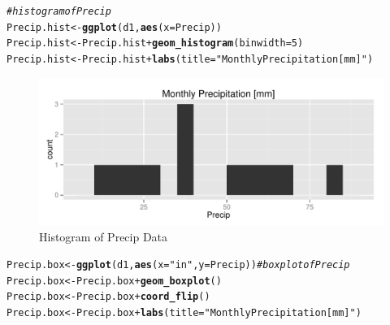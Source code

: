 \documentclass{article}\usepackage[]{graphicx}\usepackage[]{color}
\makeatletter
\def\maxwidth{ %
  \ifdim\Gin@nat@width>\linewidth
    \linewidth
  \else
    \Gin@nat@width
  \fi
}
\newcommand{\hlnum}[1]{\textcolor[rgb]{0.686,0.059,0.569}{#1}}%
\newcommand{\hlstr}[1]{\textcolor[rgb]{0.192,0.494,0.8}{#1}}%
\newcommand{\hlcom}[1]{\textcolor[rgb]{0.678,0.584,0.686}{\textit{#1}}}%
\newcommand{\hlopt}[1]{\textcolor[rgb]{0,0,0}{#1}}%
\newcommand{\hlstd}[1]{\textcolor[rgb]{0.345,0.345,0.345}{#1}}%
\newcommand{\hlkwb}[1]{\textcolor[rgb]{0.69,0.353,0.396}{#1}}%
\newcommand{\hlkwc}[1]{\textcolor[rgb]{0.333,0.667,0.333}{#1}}%
\newcommand{\hlkwd}[1]{\textcolor[rgb]{0.737,0.353,0.396}{\textbf{#1}}}%
\newenvironment{kframe}{%
 \def\at@end@of@kframe{}%
 \ifinner\ifhmode%
  \def\at@end@of@kframe{\end{minipage}}%
  \begin{minipage}{\columnwidth}%
 \fi\fi%
 \def\FrameCommand##1{\hskip\@totalleftmargin \hskip-\fboxsep
 \colorbox{shadecolor}{##1}\hskip-\fboxsep
     \hskip-\linewidth \hskip-\@totalleftmargin \hskip\columnwidth}%
 \MakeFramed {\advance\hsize-\width
   \@totalleftmargin\z@ \linewidth\hsize
   \@setminipage}}%
 {\par\unskip\endMakeFramed%
 \at@end@of@kframe}
\newenvironment{knitrout}{}{} %
\makeatother
\begin{document}
\begin{enumerate}
\begin{enumerate}
\begin{knitrout}
\color{fgcolor}\begin{kframe}
\begin{alltt}
\hlcom{# histogram of Precip}
\hlstd{Precip.hist} \hlkwb{<-} \hlkwd{ggplot}\hlstd{(d1,} \hlkwd{aes}\hlstd{(}\hlkwc{x} \hlstd{= Precip))}
\hlstd{Precip.hist} \hlkwb{<-} \hlstd{Precip.hist} \hlopt{+} \hlkwd{geom_histogram}\hlstd{(}\hlkwc{binwidth} \hlstd{=} \hlnum{5}\hlstd{)}
\hlstd{Precip.hist} \hlkwb{<-} \hlstd{Precip.hist} \hlopt{+} \hlkwd{labs}\hlstd{(}\hlkwc{title} \hlstd{=} \hlstr{"Monthly Precipitation [mm]"}\hlstd{)}
\end{alltt}
\end{kframe}
\end{knitrout}

\begin{figure}[H]  \begin{center}
\begin{knitrout}
\color{fgcolor}
\includegraphics[width=\maxwidth]{figure/1p_hist} 

\end{knitrout}
\end{center} \vspace{-0.25in}\caption{Histogram of Precip Data} \end{figure}

\begin{knitrout}
\color{fgcolor}\begin{kframe}
\begin{alltt}
\hlstd{Precip.box} \hlkwb{<-} \hlkwd{ggplot}\hlstd{(d1,} \hlkwd{aes}\hlstd{(}\hlkwc{x} \hlstd{=} \hlstr{"in"}\hlstd{,} \hlkwc{y} \hlstd{= Precip))} \hlcom{# boxplot of Precip}
\hlstd{Precip.box} \hlkwb{<-} \hlstd{Precip.box} \hlopt{+} \hlkwd{geom_boxplot}\hlstd{()}
\hlstd{Precip.box} \hlkwb{<-} \hlstd{Precip.box} \hlopt{+} \hlkwd{coord_flip}\hlstd{()}
\hlstd{Precip.box} \hlkwb{<-} \hlstd{Precip.box} \hlopt{+} \hlkwd{labs}\hlstd{(}\hlkwc{title} \hlstd{=} \hlstr{"Monthly Precipitation [mm]"}\hlstd{)}
\end{alltt}
\end{kframe}
\end{knitrout}


\end{enumerate}
\end{enumerate}
\end{document}
